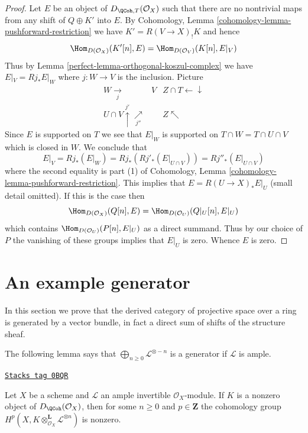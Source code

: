 \begin{proof}
\medskip\noindent
Let $E$ be an object of $D_{\QCoh, T}(\mathcal{O}_X)$ such that
there are no nontrivial maps from any shift of $Q \oplus K'$ into $E$.
By Cohomology, Lemma \ref{cohomology-lemma-pushforward-restriction}
we have $K' =  R(V \to X)_! K$ and hence
$$
\Hom_{D(\mathcal{O}_X)}(K'[n], E) = \Hom_{D(\mathcal{O}_V)}(K[n], E|_V)
$$
Thus by Lemma \ref{perfect-lemma-orthogonal-koszul-complex} we have
$E|_V = Rj_*E|_W$ where $j : W \to V$ is the inclusion. Picture
$$
\begin{array}{ccc}W \underset{j}{\longrightarrow} & V & Z \cap T \longleftarrow\downarrow \\ U \cap V \overset{j'}{\uparrow}\underset{j''}{\nearrow} &  & Z \nwarrow\end{array}
$$
Since $E$ is supported on $T$ we see that $E|_W$ is supported on
$T \cap W = T \cap U \cap V$ which is closed in $W$.
We conclude that
$$
E|_V = Rj_*(E|_W) = Rj_*(Rj'_*(E|_{U \cap V})) = Rj''_*(E|_{U \cap V})
$$
where the second equality is part (1) of
Cohomology, Lemma \ref{cohomology-lemma-pushforward-restriction}.
This implies that $E = R(U \to X)_*E|_U$ (small detail omitted). If
this is the case then
$$
\Hom_{D(\mathcal{O}_X)}(Q[n], E) = \Hom_{D(\mathcal{O}_U)}(Q|_U[n], E|_U)
$$
which contains $\Hom_{D(\mathcal{O}_U)}(P[n], E|_U)$ as a direct summand.
Thus by our choice of $P$ the vanishing of these groups implies that $E|_U$
is zero. Whence $E$ is zero.
\end{proof}

\section{An example generator}
\label{perfect-section-example-generator}
In this section we prove that the derived category of projective
space over a ring is generated by a vector bundle, in fact a direct
sum of shifts of the structure sheaf.

\medskip\noindent
The following lemma says that $\bigoplus_{n \geq 0} \mathcal{L}^{\otimes -n}$
is a generator if $\mathcal{L}$ is ample.

\begin{lemma}
\label{perfect-lemma-nonzero-some-cohomology}
\href{https://stacks.math.columbia.edu/tag/0BQR}{\texttt{Stacks tag 0BQR}}

Let $X$ be a scheme and $\mathcal{L}$ an ample invertible
$\mathcal{O}_X$-module. If $K$ is a nonzero object of
$D_\QCoh(\mathcal{O}_X)$, then for some $n \geq 0$ and $p \in \mathbf{Z}$
the cohomology group
$H^p(X, K \otimes_{\mathcal{O}_X}^\mathbf{L} \mathcal{L}^{\otimes n})$
is nonzero.
\end{lemma}

